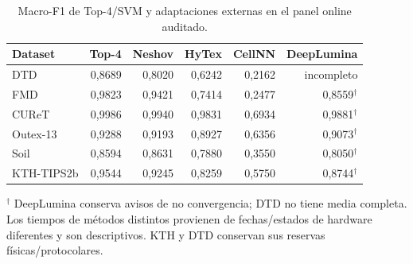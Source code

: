\begin{table}[!htbp]\centering
\fontsize{8}{10}\selectfont\setlength{\tabcolsep}{4pt}
\caption{Macro-F1 de Top-4/SVM y adaptaciones externas en el panel online auditado.}\label{tab:tm-externos-f1}
\begin{tabular}{@{}lrrrrr@{}}\toprule
Dataset & Top-4 & Neshov & HyTex & CellNN & DeepLumina\\\midrule
DTD & 0,8689 & 0,8020 & 0,6242 & 0,2162 & incompleto\\
FMD & 0,9823 & 0,9421 & 0,7414 & 0,2477 & 0,8559$^\dagger$\\
CUReT & 0,9986 & 0,9940 & 0,9831 & 0,6934 & 0,9881$^\dagger$\\
Outex-13 & 0,9288 & 0,9193 & 0,8927 & 0,6356 & 0,9073$^\dagger$\\
Soil & 0,8594 & 0,8631 & 0,7880 & 0,3550 & 0,8050$^\dagger$\\
KTH-TIPS2b & 0,9544 & 0,9245 & 0,8259 & 0,5750 & 0,8744$^\dagger$\\
\bottomrule\end{tabular}
\par\smallskip\begin{minipage}{0.98\textwidth}\footnotesize $^\dagger$ DeepLumina conserva avisos de no convergencia; DTD no tiene media completa. Los tiempos de métodos distintos provienen de fechas/estados de hardware diferentes y son descriptivos. KTH y DTD conservan sus reservas físicas/protocolares.\end{minipage}
\end{table}
